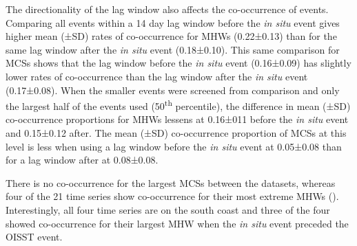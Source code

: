 \documentclass[a4paper,10pt,review]{elsarticle}
\begin{document}
The directionality of the lag window also affects the co-occurrence of events. Comparing all events within a 14 day lag window before the \emph{in situ} event gives higher mean (±SD) rates of co-occurrence for MHWs (0.22±0.13) than for the same lag window after the \emph{in situ} event (0.18±0.10). This same comparison for MCSs shows that the lag window before the \emph{in situ} event (0.16±0.09) has slightly lower rates of co-occurrence than the lag window after the \emph{in situ} event (0.17±0.08). When the smaller events were screened from comparison and only the largest half of the events used (50\textsuperscript{th} percentile), the difference in mean (±SD) co-occurrence proportions for MHWs lessens at 0.16±011 before the \emph{in situ} event and 0.15±0.12 after. The mean (±SD) co-occurrence proportion of MCSs at this level is less when using a lag window before the \emph{in situ} event at 0.05±0.08 than for a lag window after at 0.08±0.08.

There is no co-occurrence for the largest MCSs between the datasets, whereas four of the 21 time series show co-occurrence for their most extreme MHWs (). Interestingly, all four time series are on the south coast and three of the four showed co-occurrence for their largest MHW when the \emph{in situ} event preceded the OISST event.
\end{document}
